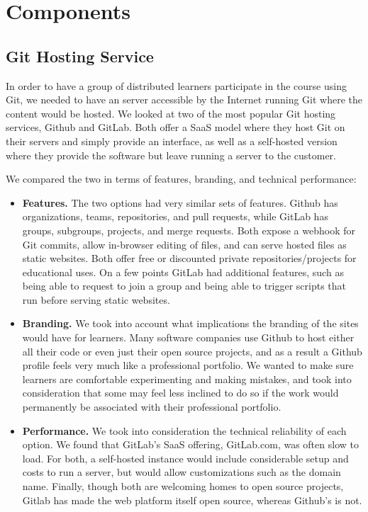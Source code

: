 \documentclass[12pt,twoside]{mitthesis}
\begin{document}
\section{Components}

\subsection{Git Hosting Service}

In order to have a group of distributed learners participate in the course using Git, we needed to have an server accessible by the Internet running Git where the content would be hosted. We looked at two of the most popular Git hosting services, Github and GitLab. Both offer a SaaS model where they host Git on their servers and simply provide an interface, as well as a self-hosted version where they provide the software but leave running a server to the customer.

We compared the two in terms of features, branding, and technical performance:

\begin{itemize}
\item \textbf{Features.} The two options had very similar sets of features. Github has organizations, teams, repositories, and pull requests, while GitLab has groups, subgroups, projects, and merge requests. Both expose a webhook for Git commits, allow in-browser editing of files, and can serve hosted files as static websites. Both offer free or discounted private repositories/projects for educational uses. On a few points GitLab had additional features, such as being able to request to join a group and being able to trigger scripts that run before serving static websites.
\item \textbf{Branding.} We took into account what implications the branding of the sites would have for learners. Many software companies use Github to host either all their code or even just their open source projects, and as a result a Github profile feels very much like a professional portfolio. We wanted to make sure learners are comfortable experimenting and making mistakes, and took into consideration that some may feel less inclined to do so if the work would permanently be associated with their professional portfolio. 
\item \textbf{Performance.} We took into consideration the technical reliability of each option. We found that GitLab's SaaS offering, GitLab.com, was often slow to load. For both, a self-hosted instance would include considerable setup and costs to run a server, but would allow customizations such as the domain name. Finally, though both are welcoming homes to open source projects, Gitlab has made the web platform itself open source, whereas Github's is not.
\end{itemize}
\end{document}
